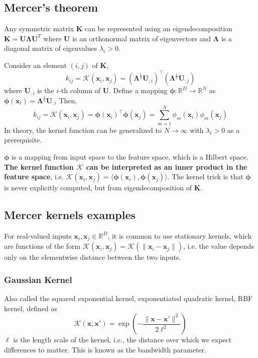 \documentclass[11pt]{article}
\begin{document}
\subsection{Mercer's theorem}
Any symmetric matrix $\mathbf{K}$ can be represented using an eigendecomposition $\mathbf{K} = \mathbf{U} \boldsymbol{\Lambda} \mathbf{U}^T$ where $\mathbf{U}$ is an orthonormal matrix of eigenvectors and $\boldsymbol{\Lambda}$ is a diagonal matrix of eigenvalues $\lambda_i > 0$.

Consider an element $(i, j)$ of $\mathbf{K}$,
\[
k_{ij} = \mathcal{K}(\boldsymbol{x}_i, \boldsymbol{x}_j)  = (\boldsymbol{\Lambda}^{\frac{1}{2}} \mathbf{U}_{:i})^\top (\boldsymbol{\Lambda}^{\frac{1}{2}} \mathbf{U}_{:j})
\]
where $\mathbf{U}_{:i}$ is the $i$-th column of $\mathbf{U}$. Define a mapping $\boldsymbol{\phi}: \mathbb{R}^D \to \mathbb{R}^N$ as
$\boldsymbol{\phi}(\boldsymbol{x}_i) = \boldsymbol{\Lambda}^{\frac{1}{2}} \mathbf{U}_{:i}$
Then,
\[
k_{ij} = \mathcal{K}(\boldsymbol{x}_i, \boldsymbol{x}_j) = \boldsymbol{\phi}(\boldsymbol{x}_i)^\top \boldsymbol{\phi}(\boldsymbol{x}_j)
= \sum_{m = 1}^N \phi_m(\boldsymbol{x}_i) \phi_m(\boldsymbol{x}_j)
\]
In theory, the kernel function can be generalized to $N \to \infty$ with $\lambda_i > 0$ as a prerequisite.

$\boldsymbol{\phi}$ is a mapping from input space to the feature space, which is a Hilbert space. \textbf{The kernel function $\mathcal{K}$ can be interpreted as an inner product in the feature space}, i.e. $\mathcal{K}(\boldsymbol{x}_i, \boldsymbol{x}_j) = \langle \boldsymbol{\phi}(\boldsymbol{x}_i), \boldsymbol{\phi}(\boldsymbol{x}_j) \rangle$.
The kernel trick is that $\boldsymbol{\phi}$ is never explicitly computed, but from eigendecomposition of $\mathbf{K}$.

\subsection{Mercer kernels examples}

For real-valued inputs $\boldsymbol{x}_i, \boldsymbol{x}_j \in \mathbb{R}^D$, it is common to use stationary kernels, which are functions of the form $\mathcal{K}(\boldsymbol{x}_i, \boldsymbol{x}_j) = \mathcal{K}(\|\boldsymbol{x}_i - \boldsymbol{x}_j\|)$, i.e. the value depends only on the elementwise distance between the two inputs.

\subsubsection*{Gaussian Kernel}
Also called the squared exponential kernel, exponentiated quadratic kernel, RBF kernel, defined as
\[
\mathcal{K}(\boldsymbol{x}, \boldsymbol{x}')= \exp\left(-\frac{\|\boldsymbol{x} - \boldsymbol{x}'\|^2}{2\ell^2}\right)
\]
$\ell$ is the length scale of the kernel, i.e., the distance over which we expect differences to matter. This is known as the bandwidth parameter.
\end{document}
